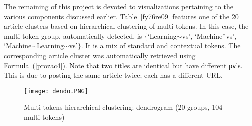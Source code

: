 \documentclass[oneside,10pt]{book}
\begin{document}
\begin{table}[H]
\begin{center}
\caption{\label{fy76re09}Cluster linked to $\{$`Learning$\sim$vs', `Machine$^\wedge$vs', `Machine$\sim$Learning$\sim$vs'$\}$}
\end{center}
\end{table}

The remaining of this project is devoted to visualizations pertaining to the various components discussed earlier. 
Table~\ref{fy76re09} features one of the 20 article clusters based on hierarchical clustering of multi-tokens. 
In this case, the multi-token group, automatically detected, is
$\{$`Learning$\sim$vs', `Machine$^\wedge$vs', `Machine$\sim$Learning$\sim$vs'$\}$. It is a mix of standard and contextual tokens.
The corresponding article cluster was automatically retrieved using Formula~(\ref{prozac4}). Note that two titles are identical but have
 different \texttt{pv}'s. This is due to posting the same article twice; each has a different URL. 


\begin{figure}[H]
\centering
\texttt{[image: dendo.PNG]}
\caption{Multi-tokens hierarchical clustering: dendrogram (20 groups, 104 multi-tokens)}
\label{fig:z0m4rgv098}
\end{figure}
\end{document}
